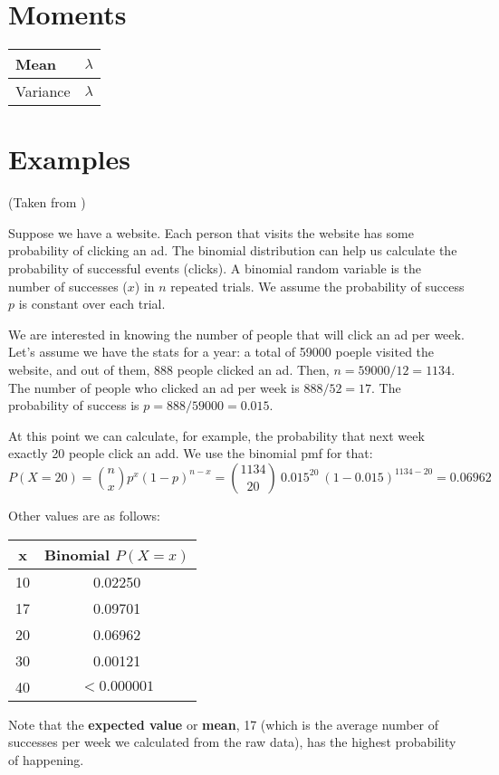 \section{Moments}

\begin{tabularx}{\textwidth}{s X}
	\hline
	Mean & $\lambda$ \\\hline
	Variance & $\lambda$\\\hline
\end{tabularx}

\section{Examples}

\begin{example}
	(Taken from \cite{AerinKim})

	Suppose we have a website. Each person that visits the website has some probability of clicking an ad. The binomial distribution can help us calculate the probability of successful events (clicks).
	A binomial random variable is the number of successes ($x$) in $n$ repeated trials. We assume the probability of success $p$ is constant over each trial.

	We are interested in knowing the number of people that will click an ad per week. Let's assume we have the stats for a year: a total of 59000 poeple visited the website, and out of them, 888 people clicked an ad.
	Then, $n = 59000/12 = 1134$. The number of people who clicked an ad per week is $888/52 = 17$. The probability of success is $p = 888/59000 = 0.015$.

	At this point we can calculate, for example, the probability that next week exactly 20 people click an add. We use the binomial pmf for that:
	\[
		P(X = 20) = \binom{n}{x} p^x (1 - p)^{n - x} = \binom{1134}{20} \ 0.015^20 \ (1 - 0.015)^{1134 - 20} = 0.06962
	\]

	Other values are as follows:

	\begin{tabular}{c | c}
		x & Binomial $P(X = x)$ \\\hline
		10 & 0.02250 \\\hline
		17 & 0.09701 \\\hline
		20 & 0.06962 \\\hline
		30 & 0.00121 \\\hline
		40 & $< 0.000001$ \\
	\end{tabular}

	Note that the \textbf{expected value} or \textbf{mean}, 17 (which is the average number of successes per week we calculated from the raw data), has the highest probability of happening.
\end{example}

